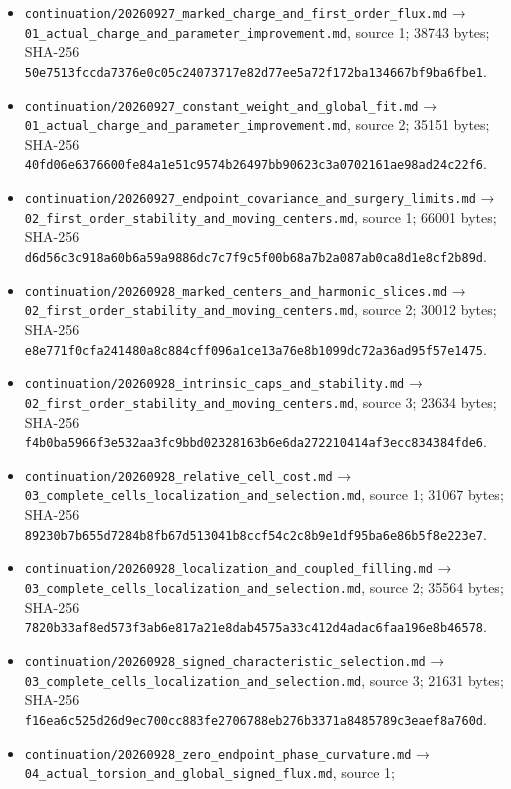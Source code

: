 \documentclass[
  10pt,
]{article}
\providecommand{\tightlist}{%
  \setlength{\itemsep}{0pt}\setlength{\parskip}{0pt}}
\begin{document}
\begin{itemize}
\tightlist
\item
  \nolinkurl{continuation/20260927_marked_charge_and_first_order_flux.md}
  → \nolinkurl{01_actual_charge_and_parameter_improvement.md}, source
  1; 38743 bytes; SHA-256
  \nolinkurl{50e7513fccda7376e0c05c24073717e82d77ee5a72f172ba134667bf9ba6fbe1}.
\item
  \nolinkurl{continuation/20260927_constant_weight_and_global_fit.md}
  → \nolinkurl{01_actual_charge_and_parameter_improvement.md}, source
  2; 35151 bytes; SHA-256
  \nolinkurl{40fd06e6376600fe84a1e51c9574b26497bb90623c3a0702161ae98ad24c22f6}.
\item
  \nolinkurl{continuation/20260927_endpoint_covariance_and_surgery_limits.md}
  → \nolinkurl{02_first_order_stability_and_moving_centers.md},
  source 1; 66001 bytes; SHA-256
  \nolinkurl{d6d56c3c918a60b6a59a9886dc7c7f9c5f00b68a7b2a087ab0ca8d1e8cf2b89d}.
\item
  \nolinkurl{continuation/20260928_marked_centers_and_harmonic_slices.md}
  → \nolinkurl{02_first_order_stability_and_moving_centers.md},
  source 2; 30012 bytes; SHA-256
  \nolinkurl{e8e771f0cfa241480a8c884cff096a1ce13a76e8b1099dc72a36ad95f57e1475}.
\item
  \nolinkurl{continuation/20260928_intrinsic_caps_and_stability.md} →
  \nolinkurl{02_first_order_stability_and_moving_centers.md}, source
  3; 23634 bytes; SHA-256
  \nolinkurl{f4b0ba5966f3e532aa3fc9bbd02328163b6e6da272210414af3ecc834384fde6}.
\item
  \nolinkurl{continuation/20260928_relative_cell_cost.md} →
  \nolinkurl{03_complete_cells_localization_and_selection.md}, source
  1; 31067 bytes; SHA-256
  \nolinkurl{89230b7b655d7284b8fb67d513041b8ccf54c2c8b9e1df95ba6e86b5f8e223e7}.
\item
  \nolinkurl{continuation/20260928_localization_and_coupled_filling.md}
  → \nolinkurl{03_complete_cells_localization_and_selection.md},
  source 2; 35564 bytes; SHA-256
  \nolinkurl{7820b33af8ed573f3ab6e817a21e8dab4575a33c412d4adac6faa196e8b46578}.
\item
  \nolinkurl{continuation/20260928_signed_characteristic_selection.md} →
  \nolinkurl{03_complete_cells_localization_and_selection.md}, source
  3; 21631 bytes; SHA-256
  \nolinkurl{f16ea6c525d26d9ec700cc883fe2706788eb276b3371a8485789c3eaef8a760d}.
\item
  \nolinkurl{continuation/20260928_zero_endpoint_phase_curvature.md} →
  \nolinkurl{04_actual_torsion_and_global_signed_flux.md}, source 1;

\end{itemize}
\end{document}
